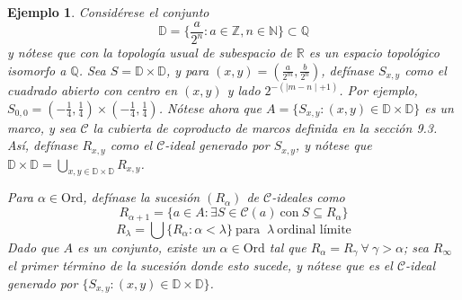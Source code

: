 \documentclass[12pt,letterpaper,titlepage]{article}
\newtheorem*{exa}{Ejemplo}
\theoremstyle{definition}
\newcommand\<{\langle}
\renewcommand\>{\rangle}
\newcommand{\Ord}{\mathrm{Ord}}
\begin{document}
\begin{exa}
Considérese el conjunto 
$$\mathbb{D}=\{\frac{a}{2^n}:a\in\mathbb{Z},n\in\mathbb{N}\}\subset\mathbb{Q}$$
y nótese que con la topología usual de subespacio de $\mathbb{R}$ es un espacio topológico isomorfo a $\mathbb{Q}$. Sea $S=\mathbb{D}\times\mathbb{D}$, y para $(x,y)=(\frac{a}{2^m},\frac{b}{2^n})$, defínase $S_{x,y}$ como el cuadrado abierto con centro en $(x,y)$ y lado $2^{-(\mid m-n\mid+1)}$. Por ejemplo, $S_{0,0}=(-\tfrac{1}{4},\tfrac{1}{4})\times (-\tfrac{1}{4},\tfrac{1}{4})$.
Nótese ahora que $A=\{S_{x,y}:(x,y)\in\mathbb{D}\times\mathbb{D}\}$ es un marco, y sea $\mathcal{C}$ la cubierta de coproducto de marcos definida en la sección 9.3. Así, defínase $R_{x,y}$ como el $\mathcal{C}$-ideal generado por $S_{x,y}$, y nótese que $\mathbb{D}\times\mathbb{D}=\bigcup\limits_{x,y\in\mathbb{D}\times\mathbb{D}}R_{x,y}$.

Para $\alpha\in\Ord$, defínase la sucesión $(R_\alpha)$ de $\mathcal{C}$-ideales como 
$$R_{\alpha+1}=\{a\in A : \exists S\in \mathcal{C}(a) \ \text{con} \ S\subseteq R_\alpha\}$$
$$ R_\lambda =\bigcup\{R_\alpha : \alpha<\lambda\} \ \text{para } \ \lambda \ \text{ordinal límite}$$
Dado que $A$ es un conjunto, existe un $\alpha\in\Ord$ tal que $R_\alpha=R_\gamma \ \forall \ \gamma>\alpha$; sea $R_\infty$ el primer término de la sucesión donde esto sucede, y nótese que es el $\mathcal{C}$-ideal generado por $\{S_{x,y}:(x,y)\in\mathbb{D}\times\mathbb{D}\}$.


\end{exa}
\end{document}

